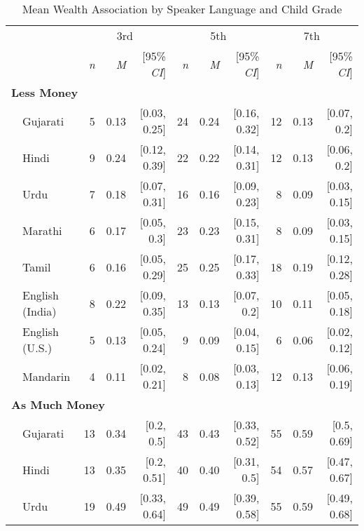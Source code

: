 \begin{table}[t]
\centering
\caption{Mean Wealth Association by Speaker Language and Child Grade}
\begin{footnotesize}
\label{tab:wealth-means}
\begin{tabular}{p{.1in}lrrrrrrrrr}
\toprule
 &  & \multicolumn{3}{c}{3rd} & \multicolumn{3}{c}{5th} & \multicolumn{3}{c}{7th} \\
\cline{3-5} \cline{6-8} \cline{9-11}
&  & \textit{n} & \textit{M} & [95\% \textit{CI}] &  \textit{n} & \textit{M} & [95\% \textit{CI}] &  \textit{n}  & \textit{M} & [95\% \textit{CI}]\\
\midrule
\multicolumn{11}{l}{\textbf{Less Money}}\\
 & Gujarati & 5 & 0.13 & [0.03, 0.25] & 24 & 0.24 & [0.16, 0.32] & 12 & 0.13 & [0.07, 0.2]\\

 & Hindi & 9 & 0.24 & [0.12, 0.39] & 22 & 0.22 & [0.14, 0.31] & 12 & 0.13 & [0.06, 0.2]\\

 & Urdu & 7 & 0.18 & [0.07, 0.31] & 16 & 0.16 & [0.09, 0.23] & 8 & 0.09 & [0.03, 0.15]\\

 & Marathi & 6 & 0.17 & [0.05, 0.3] & 23 & 0.23 & [0.15, 0.31] & 8 & 0.09 & [0.03, 0.15]\\

 & Tamil & 6 & 0.16 & [0.05, 0.29] & 25 & 0.25 & [0.17, 0.33] & 18 & 0.19 & [0.12, 0.28]\\

 & English (India) & 8 & 0.22 & [0.09, 0.35] & 13 & 0.13 & [0.07, 0.2] & 10 & 0.11 & [0.05, 0.18]\\

 & English (U.S.) & 5 & 0.13 & [0.05, 0.24] & 9 & 0.09 & [0.04, 0.15] & 6 & 0.06 & [0.02, 0.12]\\

& Mandarin & 4 & 0.11 & [0.02, 0.21] & 8 & 0.08 & [0.03, 0.13] & 12 & 0.13 & [0.06, 0.19]\\
\midrule
\multicolumn{11}{l}{\textbf{As Much Money}}\\
 & Gujarati & 13 & 0.34 & [0.2, 0.5] & 43 & 0.43 & [0.33, 0.52] & 55 & 0.59 & [0.5, 0.69]\\

 & Hindi & 13 & 0.35 & [0.2, 0.51] & 40 & 0.40 & [0.31, 0.5] & 54 & 0.57 & [0.47, 0.67]\\

 & Urdu & 19 & 0.49 & [0.33, 0.64] & 49 & 0.49 & [0.39, 0.58] & 55 & 0.59 & [0.49, 0.68]\\


\end{tabular}
\end{footnotesize}
\end{table}
